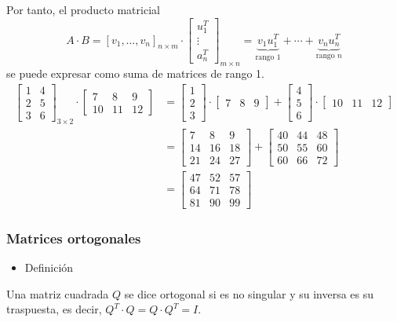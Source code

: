 Por tanto, el producto matricial \[ A\cdot B=[v_1,\dots,v_n]_{n\times m}\cdot\begin{bmatrix}
	u_1^T\\
	\vdots\\
	a_n^T
\end{bmatrix}_{m\times n}=\underbrace{v_1u_1^T}_{\text{rango }1}+\cdots+\underbrace{v_nu_n^T}_{\text{rango }n} \] se puede expresar como suma de matrices de rango 1.
\[\begin{aligned}
	\begin{bmatrix}
	1 & 4 \\
	2 & 5 \\
	3 & 6
\end{bmatrix}_{3\times2}\cdot\begin{bmatrix}
7 & 8 & 9 \\
10 & 11 & 12
\end{bmatrix} & =\begin{bmatrix}
1\\
2\\
3
\end{bmatrix}\cdot\begin{bmatrix}
 7 & 8 & 9
\end{bmatrix}+\begin{bmatrix}
4\\
5\\
6
\end{bmatrix}\cdot\begin{bmatrix}
10 & 11 & 12
\end{bmatrix}\\
& =\begin{bmatrix}
	7 & 8 & 9 \\
	14 & 16 & 18 \\
	21 & 24 & 27
\end{bmatrix}+\begin{bmatrix}
40 & 44 & 48 \\
50 & 55 & 60 \\
60 & 66 & 72
\end{bmatrix}\\
&=\begin{bmatrix}
	47 & 52 & 57 \\
	64 & 71 & 78 \\
	81 & 90 & 99
\end{bmatrix}
\end{aligned}\]
\subsubsection{Matrices ortogonales}
\begin{itemize}[label=\color{red}\textbullet, leftmargin=*]
	\item \color{lightblue}Definición
\end{itemize}
Una matriz cuadrada $Q$ se dice ortogonal si es no singular y su inversa es su traspuesta, es decir, $Q^T\cdot Q=Q\cdot Q^T=I$.


